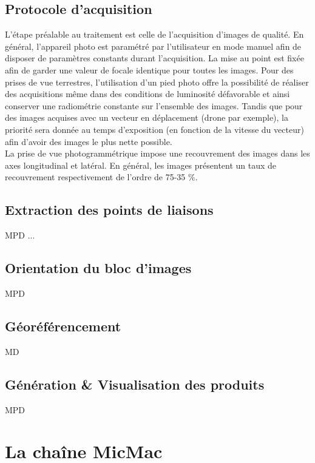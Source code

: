 \documentclass[a4paper,10pt]{article} %
\begin{document}
\subsection{Protocole d'acquisition}
L'étape préalable au traitement est celle de l'acquisition d'images de qualité. En général, l'appareil photo est paramétré par l'utilisateur en mode manuel afin de disposer de paramètres constants durant l’acquisition. La mise au point est fixée afin de garder une valeur de focale identique pour toutes les images. Pour des prises de vue terrestres, l'utilisation d'un pied photo offre la possibilité de réaliser des acquisitions même dans des conditions de luminosité défavorable et ainsi conserver une radiométrie constante sur l'ensemble des images. Tandis que pour des images acquises avec un vecteur en déplacement (drone par exemple), la priorité sera donnée au temps d'exposition (en fonction de la vitesse du vecteur) afin d'avoir des images le plus nette possible.\newline
\\
La prise de vue photogrammétrique impose une recouvrement des images dans les axes longitudinal et latéral. En général, les images présentent un taux de recouvrement respectivement de l'ordre de 75-35 $\%$.

\subsection{Extraction des points de liaisons}
MPD
...
\subsection{Orientation du bloc d'images}
MPD
\subsection{Géoréférencement}
MD
\subsection{Génération \& Visualisation des produits}
MPD
\section{La chaîne MicMac}
\end{document}
